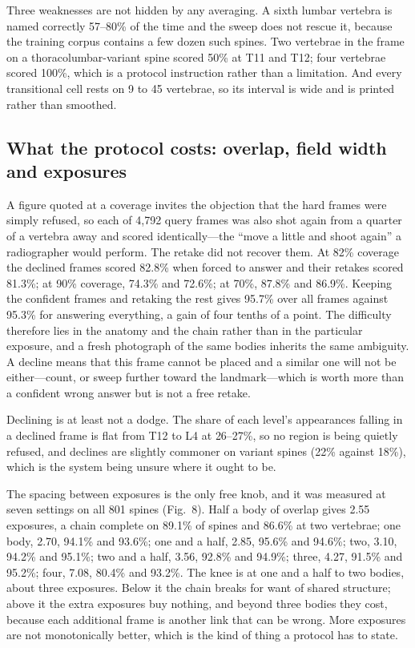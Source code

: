 \documentclass[11pt,letterpaper]{article}
\begin{document}
Three weaknesses are not hidden by any averaging. A sixth lumbar vertebra is named correctly 57--80\% of the time and the sweep does not rescue it, because the training corpus contains a few dozen such spines. Two vertebrae in the frame on a thoracolumbar-variant spine scored 50\% at T11 and T12; four vertebrae scored 100\%, which is a protocol instruction rather than a limitation. And every transitional cell rests on 9 to 45 vertebrae, so its interval is wide and is printed rather than smoothed.

\subsection*{What the protocol costs: overlap, field width and exposures}
A figure quoted at a coverage invites the objection that the hard frames were simply refused, so each of 4,792 query frames was also shot again from a quarter of a vertebra away and scored identically---the ``move a little and shoot again'' a radiographer would perform. The retake did not recover them. At 82\% coverage the declined frames scored 82.8\% when forced to answer and their retakes scored 81.3\%; at 90\% coverage, 74.3\% and 72.6\%; at 70\%, 87.8\% and 86.9\%. Keeping the confident frames and retaking the rest gives 95.7\% over all frames against 95.3\% for answering everything, a gain of four tenths of a point. The difficulty therefore lies in the anatomy and the chain rather than in the particular exposure, and a fresh photograph of the same bodies inherits the same ambiguity. A decline means that this frame cannot be placed and a similar one will not be either---count, or sweep further toward the landmark---which is worth more than a confident wrong answer but is not a free retake.

Declining is at least not a dodge. The share of each level's appearances falling in a declined frame is flat from T12 to L4 at 26--27\%, so no region is being quietly refused, and declines are slightly commoner on variant spines (22\% against 18\%), which is the system being unsure where it ought to be.

The spacing between exposures is the only free knob, and it was measured at seven settings on all 801 spines (Fig.~8). Half a body of overlap gives 2.55 exposures, a chain complete on 89.1\% of spines and 86.6\% at two vertebrae; one body, 2.70, 94.1\% and 93.6\%; one and a half, 2.85, 95.6\% and 94.6\%; two, 3.10, 94.2\% and 95.1\%; two and a half, 3.56, 92.8\% and 94.9\%; three, 4.27, 91.5\% and 95.2\%; four, 7.08, 80.4\% and 93.2\%. The knee is at one and a half to two bodies, about three exposures. Below it the chain breaks for want of shared structure; above it the extra exposures buy nothing, and beyond three bodies they cost, because each additional frame is another link that can be wrong. More exposures are not monotonically better, which is the kind of thing a protocol has to state.
\end{document}
